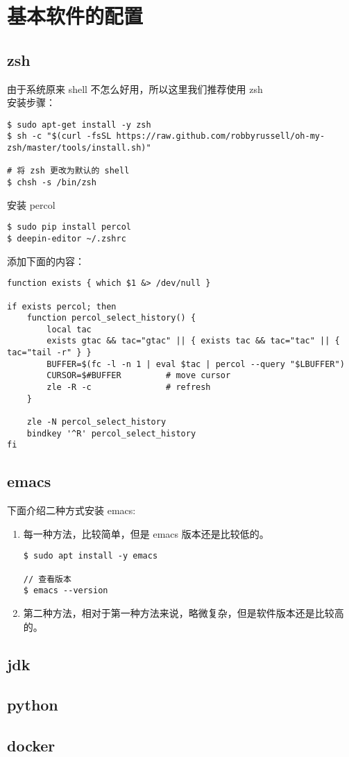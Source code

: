 \section{基本软件的配置}
\subsection{zsh}
由于系统原来 shell 不怎么好用，所以这里我们推荐使用 zsh \\

安装步骤：
\begin{lstlisting}
$ sudo apt-get install -y zsh
$ sh -c "$(curl -fsSL https://raw.github.com/robbyrussell/oh-my-zsh/master/tools/install.sh)"

# 将 zsh 更改为默认的 shell 
$ chsh -s /bin/zsh 
\end{lstlisting}

安装 percol
\begin{lstlisting}
$ sudo pip install percol
$ deepin-editor ~/.zshrc 
\end{lstlisting}

添加下面的内容：
\begin{verbatim}
function exists { which $1 &> /dev/null }

if exists percol; then
    function percol_select_history() {
        local tac
        exists gtac && tac="gtac" || { exists tac && tac="tac" || { tac="tail -r" } }
        BUFFER=$(fc -l -n 1 | eval $tac | percol --query "$LBUFFER")
        CURSOR=$#BUFFER         # move cursor
        zle -R -c               # refresh
    }

    zle -N percol_select_history
    bindkey '^R' percol_select_history
fi
\end{verbatim}

\subsection{emacs}
下面介绍二种方式安装 emacs:
\flushleft
\begin{enumerate}
\item 每一种方法，比较简单，但是 emacs 版本还是比较低的。
\begin{lstlisting}
$ sudo apt install -y emacs 

// 查看版本
$ emacs --version  
\end{lstlisting}

\item 第二种方法，相对于第一种方法来说，略微复杂，但是软件版本还是比较高的。

\end{enumerate}

\subsection{jdk}
\subsection{python}
\subsection{docker}